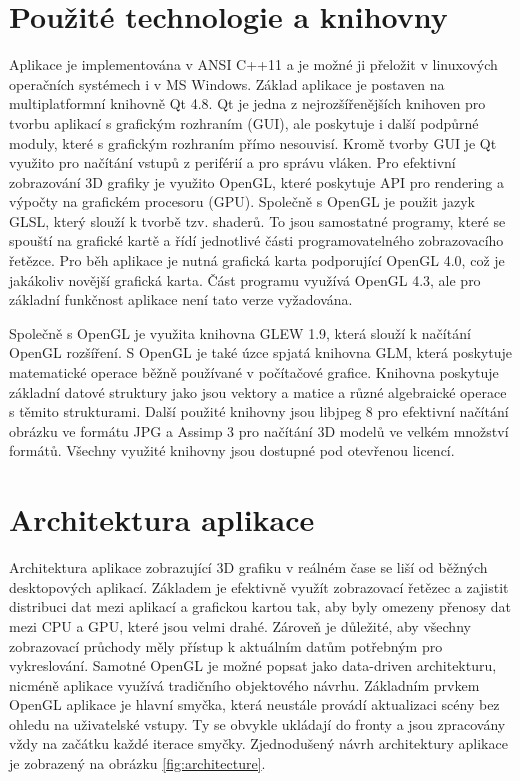 \documentclass[11pt,twoside,a4paper]{book}
\begin{document}
\section{Použité technologie a knihovny}
Aplikace je implementována v ANSI C++11 a je možné ji přeložit v linuxových operačních systémech i v MS Windows. Základ aplikace je postaven na multiplatformní knihovně Qt 4.8. Qt je jedna z nejrozšířenějších knihoven pro tvorbu aplikací s grafickým rozhraním (GUI), ale poskytuje i další podpůrné moduly, které s grafickým rozhraním přímo nesouvisí. Kromě tvorby GUI je Qt využito pro načítání vstupů z periférií a pro správu vláken. Pro efektivní zobrazování 3D grafiky je využito OpenGL, které poskytuje API pro rendering a výpočty na grafickém procesoru (GPU). Společně s OpenGL je použit jazyk GLSL, který slouží k tvorbě tzv. shaderů. To jsou samostatné programy, které se spouští na grafické kartě a řídí jednotlivé části programovatelného zobrazovacího řetězce. Pro běh aplikace je nutná grafická karta podporující OpenGL 4.0, což je jakákoliv novější grafická karta. Část programu využívá OpenGL 4.3, ale pro základní funkčnost aplikace není tato verze vyžadována. 

Společně s OpenGL je využita knihovna GLEW 1.9, která slouží k načítání OpenGL rozšíření. S OpenGL je také úzce spjatá knihovna GLM, která poskytuje matematické operace běžně používané v počítačové grafice. Knihovna poskytuje základní datové struktury jako jsou vektory a matice a různé algebraické operace s těmito strukturami. Další použité knihovny jsou libjpeg 8 pro efektivní načítání obrázku ve formátu JPG a Assimp 3 pro načítání 3D modelů ve velkém množství formátů. Všechny využité knihovny jsou dostupné pod otevřenou licencí.

\section{Architektura aplikace}

Architektura aplikace zobrazující 3D grafiku v reálném čase se liší od běžných desktopových aplikací. Základem je efektivně využít zobrazovací řetězec a zajistit distribuci dat mezi aplikací a grafickou kartou tak, aby byly omezeny přenosy dat mezi CPU a GPU, které jsou velmi drahé. Zároveň je důležité, aby všechny zobrazovací průchody měly přístup k aktuálním datům potřebným pro vykreslování. Samotné OpenGL je možné popsat jako data-driven architekturu, nicméně aplikace využívá tradičního objektového návrhu. Základním prvkem OpenGL aplikace je hlavní smyčka, která neustále provádí aktualizaci scény bez ohledu na uživatelské vstupy. Ty se obvykle ukládají do fronty a jsou zpracovány vždy na začátku každé iterace smyčky. Zjednodušený návrh architektury aplikace je zobrazený na obrázku \ref{fig:architecture}.
\end{document}
